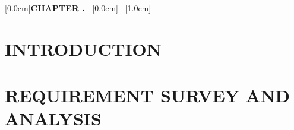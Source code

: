 \documentclass[a4paper,13pt,3p,twoside]{report}
\title{\bf \TITLE}
\author{\AUTHOR}
\renewcommand{\figurename}{Figure}
\renewcommand{\tablename}{Table}
\renewcommand{\chaptername}{CHAPTER}
\theoremstyle{definition}
\begin{document}



\renewcommand{\figurename}{Figure}
\renewcommand{\tablename}{Table}
\renewcommand{\chaptername}{CHAPTER}

\newpage


\newpage


\newpage
{}
\renewcommand*\contentsname{TABLE OF CONTENTS}

[0.0cm]{\bfseries\vspace{0.3cm}}{{\bfseries{\scshape}CHAPTER \thecontentslabel.\ }}{}{\contentspage}
[0.0cm]{\vspace{0.3cm}}{\thecontentslabel \ }{}{\contentspage}
[1.0cm]{\vspace{0.3cm}}{\thecontentslabel \ }{}{\contentspage}

\tableofcontents
\thispagestyle{empty}
\cleardoublepage

\renewcommand{\listfigurename}{LIST OF FIGURES}
{\let\oldnumberline\numberline
\renewcommand{\numberline}{Figure~\oldnumberline}
\listoffigures}
\newpage

\renewcommand{\listtablename}{LIST OF TABLES}
{\let\oldnumberline\numberline
\renewcommand{\numberline}{Table~\oldnumberline}
\listoftables}

\glsaddall
\renewcommand*{\acronymname}{LIST OF ABBREVIATIONS}
\renewcommand*{\entryname}{Abbreviation}
\renewcommand*{\descriptionname}{Full Expression}
\printnoidxglossaries

\newpage
{}

\pagestyle{fancy}
\fancyhf{}
\fancyhead[RE, LO]{\leftmark}
\fancyfoot[RE, LO]{\thepage}

\chapter{INTRODUCTION}
\label{chapter:Introduction}


\newpage
\chapter{REQUIREMENT SURVEY AND ANALYSIS}
\label{chapter:Survey}

\end{document}

